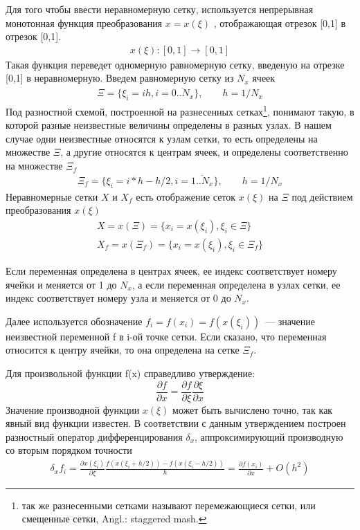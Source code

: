 Для того чтобы ввести неравномерную сетку, используется непрерывная монотонная функция преобразования $ x = x(\xi) $  , отображающая отрезок [0,1] в отрезок [0,1]. 
\begin{gather}
  x(\xi): [0,1] \longrightarrow [0,1]
\end{gather}
Такая функция переведет одномерную равномерную сетку, введеную на отрезке [0,1] в неравномерную. Введем равномерную сетку из $N_x$ ячеек 
\begin{gather}
 \Xi = \{\xi_i = ih, i = \overline{0..N_x}\}, \qquad h = 1 / N_x 
\end{gather}
Под разностной схемой, построенной на разнесенных сетках\footnote{так же разнесенными сетками называют перемежающиеся сетки, или смещенные сетки, Angl.: staggered mash.}, понимают такую, в которой разные неизвестные величины определены в разных узлах. В нашем случае одни неизвестные относятся к узлам сетки, то есть определены на множестве $\Xi$, а другие относятся к центрам ячеек, и определены соответственно на множестве $\Xi_f$
\begin{gather}
 \Xi_f = \{ \xi_i = i*h - h/2, i = \overline{1..N_x} \}, \qquad h = 1/N_x
\end{gather}
Неравномерные сетки $X$ и $X_f$ есть отображение сеток $x(\xi)$ на $\Xi$ под действием преобразования $x(\xi)$
\begin{gather}
 X = x(\Xi) = \{x_i = x(\xi_i), \xi_i \in \Xi\} \\
 X_f = x(\Xi_f) = \{ x_i = x(\xi_i), \xi_i \in \Xi_f \}
\end{gather}

Если переменная определена в центрах ячеек, ее индекс соответствует номеру ячейки и меняется от 1 до $N_x$, а если переменная определена в узлах сетки, ее индекс соответствует номеру узла и меняется от 0 до $N_x$.

Далее используется обозначение $f_i = f(x_i) = f(x(\xi_i))$~--- значение неизвестной переменной f в i-ой точке сетки. Если сказано, что переменная относится к центру ячейки, то она определена на сетке $\Xi_f$.  

Для произвольной функции f(x) справедливо утверждение:
$$
  \frac{\partial f}{\partial x} = \frac{\partial f}{\partial \xi} \frac{\partial \xi}{\partial x}
$$
Значение производной функции $x(\xi)$ может быть вычислено точно, так как явный вид функции известен.
В соответствии с данным утверждением построен разностный оператор дифференцирования $\delta_x$, аппроксимирующий производную со вторым порядком точности
\begin{gather}
 \delta_x f_i = \frac{\partial x(\xi_i)}{\partial \xi} \frac{f(x(\xi_i + h/2)) - f(x(\xi_i - h/2))}{h}  = \frac{\partial f(x_i)}{\partial x} + O(h^2)
\end{gather}

